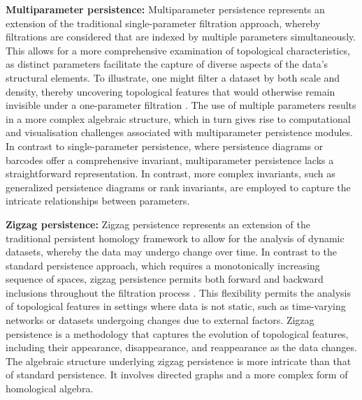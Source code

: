 \textbf{Multiparameter persistence:} Multiparameter persistence represents an extension of the traditional single-parameter filtration approach, whereby filtrations are considered that are indexed by multiple parameters simultaneously. This allows for a more comprehensive examination of topological characteristics, as distinct parameters facilitate the capture of diverse aspects of the data's structural elements. To illustrate, one might filter a dataset by both scale and density, thereby uncovering topological features that would otherwise remain invisible under a one-parameter filtration \cite{CarlssonZomorodian2009}. The use of multiple parameters results in a more complex algebraic structure, which in turn gives rise to computational and visualisation challenges associated with multiparameter persistence modules. In contrast to single-parameter persistence, where persistence diagrams or barcodes offer a comprehensive invariant, multiparameter persistence lacks a straightforward representation. In contrast, more complex invariants, such as generalized persistence diagrams or rank invariants, are employed to capture the intricate relationships between parameters.

\textbf{Zigzag persistence:} Zigzag persistence represents an extension of the traditional persistent homology framework to allow for the analysis of dynamic datasets, whereby the data may undergo change over time. In contrast to the standard persistence approach, which requires a monotonically increasing sequence of spaces, zigzag persistence permits both forward and backward inclusions throughout the filtration process \cite{Carlsson2010}. This flexibility permits the analysis of topological features in settings where data is not static, such as time-varying networks or datasets undergoing changes due to external factors. Zigzag persistence is a methodology that captures the evolution of topological features, including their appearance, disappearance, and reappearance as the data changes. The algebraic structure underlying zigzag persistence is more intricate than that of standard persistence. It involves directed graphs and a more complex form of homological algebra.


